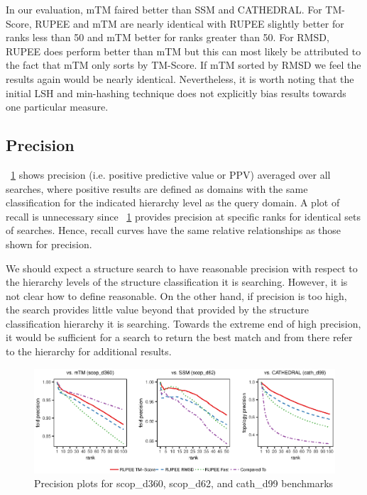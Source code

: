 \documentclass[letter,center,fleqn]{NAR}
\begin{document}
In our evaluation, mTM faired better than SSM and CATHEDRAL. 
For TM-Score, RUPEE and mTM are nearly identical with RUPEE slightly better for ranks less than 50 and mTM better for ranks greater than 50. 
For RMSD, RUPEE does perform better than mTM but this can most likely be attributed to the fact that mTM only sorts by TM-Score. 
If mTM sorted by RMSD we feel the results again would be nearly identical.
Nevertheless, it is worth noting that the initial LSH and min-hashing technique does not explicitly bias results towards one particular measure. 

\subsection{Precision}

\figurename~\ref{fig:combined_precision} shows precision (i.e. positive predictive value or PPV) averaged over all searches, where positive results are defined as domains with the same classification for the indicated hierarchy level as the query domain. 
A plot of recall is unnecessary since \figurename~\ref{fig:combined_precision} provides precision at specific ranks for identical sets of searches. 
Hence, recall curves have the same relative relationships as those shown for precision. 

We should expect a structure search to have reasonable precision with respect to the hierarchy levels of the structure classification it is searching. 
However, it is not clear how to define reasonable. 
On the other hand, if precision is too high, the search provides little value beyond that provided by the structure classification hierarchy it is searching. 
Towards the extreme end of high precision, it would be sufficient for a search to return the best match and from there refer to the hierarchy for additional results. 

\begin{figure}[tb]
\begin{center}
\includegraphics{combined_precision}
\end{center}
\caption{Precision plots for scop\_d360, scop\_d62, and cath\_d99 benchmarks}
\label{fig:combined_precision}
\end{figure}
\end{document}
